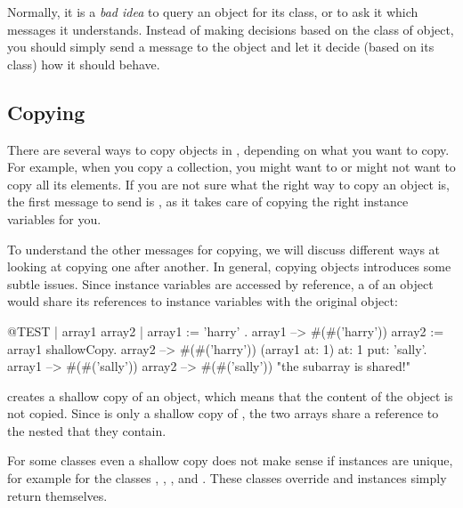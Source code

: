 \documentclass[a4paper,10pt,twoside]{book}
\begin{document}
Normally, it is a \emph{bad idea} to query an object for its class, or to ask it which messages it understands.
Instead of making decisions based on the class of object, you should simply send a message to the object and let it decide (\ie based on its class) how it should behave.

\subsection{Copying}

There are several ways to copy objects in \sq, depending on what you want to copy. For example, when you copy a collection, you might want to or might not want to copy all its elements. If you are not sure what the right way to copy an object is, the first message to send is , as it takes care of copying the right instance variables for you.

To understand the other messages for copying, we will discuss different ways at looking at copying one after another. 
In general, copying objects introduces some subtle issues.
Since instance variables are accessed by reference, a  of an object would share its references to instance variables with the original object:

\begin{code}{@TEST | array1 array2 |}
array1 := { { 'harry' } }.
array1 --> #(#('harry'))
array2 := array1 shallowCopy.
array2 --> #(#('harry'))
(array1 at: 1) at: 1 put: 'sally'.
array1 --> #(#('sally'))
array2 --> #(#('sally'))    "the subarray is shared!"
\end{code}

 creates a shallow copy of an object, which means that the content of the object is not copied.
Since  is only a shallow copy of , the two arrays share a reference to the nested  that they contain.

For some classes even a shallow copy does not make sense if instances are unique, for example for the classes , , ,  and . These classes override  and instances simply return themselves.
\end{document}
